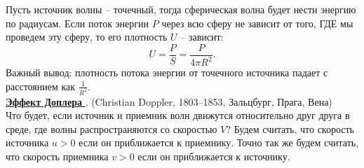 \documentclass[12pt,epsfig,color,russian]{article}
\begin{document}
 Пусть источник волны -- точечный, тогда сферическая волна будет нести энергию по радиусам. Если поток энергии $P$ через всю сферу не зависит от того, ГДЕ мы проведем эту сферу, то его плотность $U$ -- зависит:
 \begin{displaymath}
 U=\frac{P}{S}=\frac{P}{4\pi R^2}.
 \end{displaymath}
 Важный вывод: плотность потока энергии от точечного источника падает с расстоянием как $\frac1{R^2}$.\\

 \underline{\bf Эффект Доплера }. (Christian Doppler, 1803--1853, Зальцбург, Прага, Вена)\\
 Что будет, если источник и приемник волн движутся относительно друг друга в среде, где волны распространяются со скоростью $V$? Будем считать, что скорость источника $u>0$ если он приближается к приемнику. Точно так же будем считать, что скорость приемника $v>0$ если он приближается к источнику.
\end{document}
